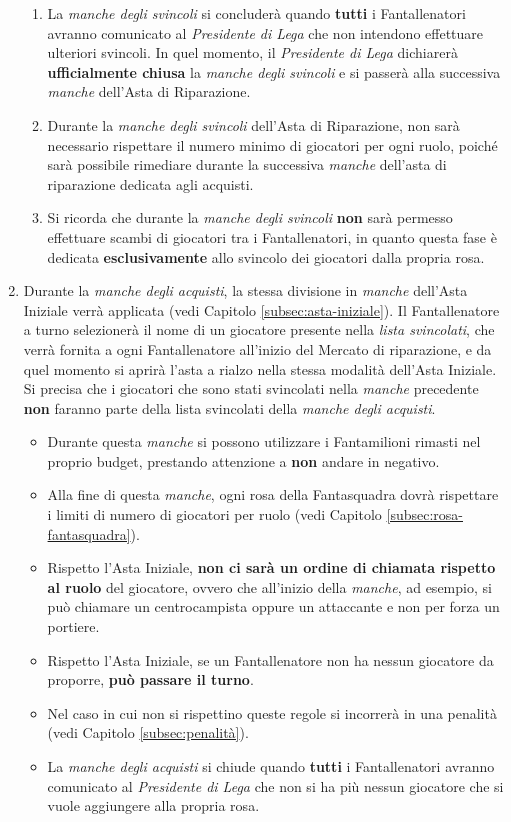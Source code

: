 \documentclass[12pt]{article}
\begin{document}
\begin{enumerate}
\begin{enumerate}
        \item La \textit{manche degli svincoli} si concluderà quando \textbf{tutti} i Fantallenatori avranno comunicato al \textit{Presidente di Lega} che non intendono effettuare ulteriori svincoli. In quel momento, il \textit{Presidente di Lega} dichiarerà \textbf{ufficialmente chiusa} la \textit{manche degli svincoli} e si passerà alla successiva \textit{manche} dell'Asta di Riparazione.
        \item Durante la \textit{manche degli svincoli} dell'Asta di Riparazione, non sarà necessario rispettare il numero minimo di giocatori per ogni ruolo, poiché sarà possibile rimediare durante la successiva \textit{manche} dell'asta di riparazione dedicata agli acquisti.
        \item Si ricorda che durante la \textit{manche degli svincoli} \textbf{non} sarà permesso effettuare scambi di giocatori tra i Fantallenatori, in quanto questa fase è dedicata \textbf{esclusivamente} allo svincolo dei giocatori dalla propria rosa.
    \end{enumerate}
    \item Durante la \textit{manche degli acquisti}, la stessa divisione in \textit{manche} dell’Asta Iniziale verrà applicata (vedi Capitolo \ref{subsec:asta-iniziale}). Il Fantallenatore a turno selezionerà il nome di un giocatore presente nella \textit{lista svincolati}, che verrà fornita a ogni Fantallenatore all’inizio del Mercato di riparazione, e da quel momento si aprirà l'asta a rialzo nella stessa modalità dell’Asta Iniziale. Si precisa che i giocatori che sono stati svincolati nella \textit{manche} precedente \textbf{non} faranno parte della lista svincolati della \textit{manche degli acquisti}.
    \begin{itemize}
        \item Durante questa \textit{manche} si possono utilizzare i Fantamilioni rimasti nel proprio budget, prestando attenzione a \textbf{non} andare in negativo.
        \item Alla fine di questa \textit{manche}, ogni rosa della Fantasquadra dovrà rispettare i limiti di numero di giocatori per ruolo (vedi Capitolo \ref{subsec:rosa-fantasquadra}).
        \item Rispetto l'Asta Iniziale, \textbf{non ci sarà un ordine di chiamata rispetto al ruolo} del giocatore, ovvero che all’inizio della \textit{manche}, ad esempio, si può chiamare un centrocampista oppure un attaccante e non per forza un portiere.
        \item Rispetto l'Asta Iniziale, se un Fantallenatore non ha nessun giocatore da proporre, \textbf{può passare il turno}.
        \item Nel caso in cui non si rispettino queste regole si incorrerà in una penalità (vedi Capitolo \ref{subsec:penalità}).
        \item La \textit{manche degli acquisti} si chiude quando \textbf{tutti} i Fantallenatori avranno comunicato al \textit{Presidente di Lega} che non si ha più nessun giocatore che si vuole aggiungere alla propria rosa.
    \end{itemize}
\end{enumerate}
\end{document}
